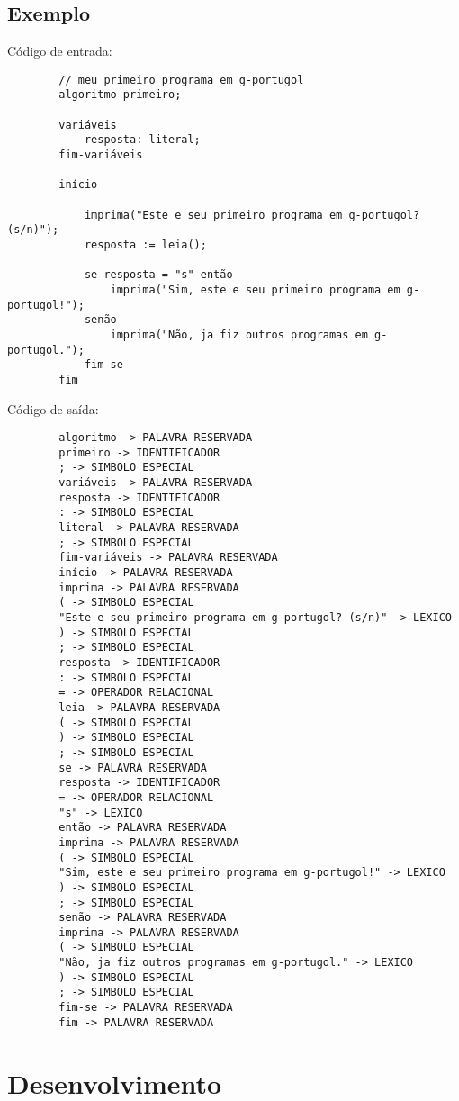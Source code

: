 \documentclass[a4paper,10pt]{article}
\begin{document}
	\subsection{Exemplo}
		C\'odigo de entrada:

		\begin{verbatim}
		// meu primeiro programa em g-portugol
		algoritmo primeiro;

		variáveis
			resposta: literal;
		fim-variáveis

		início

			imprima("Este e seu primeiro programa em g-portugol? (s/n)");
			resposta := leia();

			se resposta = "s" então
				imprima("Sim, este e seu primeiro programa em g-portugol!");
			senão
				imprima("Não, ja fiz outros programas em g-portugol.");
			fim-se
		fim
		\end{verbatim}

		C\'odigo de saída:

		\begin{verbatim}
		algoritmo -> PALAVRA RESERVADA
		primeiro -> IDENTIFICADOR
		; -> SIMBOLO ESPECIAL
		variáveis -> PALAVRA RESERVADA
		resposta -> IDENTIFICADOR
		: -> SIMBOLO ESPECIAL
		literal -> PALAVRA RESERVADA
		; -> SIMBOLO ESPECIAL
		fim-variáveis -> PALAVRA RESERVADA
		início -> PALAVRA RESERVADA
		imprima -> PALAVRA RESERVADA
		( -> SIMBOLO ESPECIAL
		"Este e seu primeiro programa em g-portugol? (s/n)" -> LEXICO
		) -> SIMBOLO ESPECIAL
		; -> SIMBOLO ESPECIAL
		resposta -> IDENTIFICADOR
		: -> SIMBOLO ESPECIAL
		= -> OPERADOR RELACIONAL
		leia -> PALAVRA RESERVADA
		( -> SIMBOLO ESPECIAL
		) -> SIMBOLO ESPECIAL
		; -> SIMBOLO ESPECIAL
		se -> PALAVRA RESERVADA
		resposta -> IDENTIFICADOR
		= -> OPERADOR RELACIONAL
		"s" -> LEXICO
		então -> PALAVRA RESERVADA
		imprima -> PALAVRA RESERVADA
		( -> SIMBOLO ESPECIAL
		"Sim, este e seu primeiro programa em g-portugol!" -> LEXICO
		) -> SIMBOLO ESPECIAL
		; -> SIMBOLO ESPECIAL
		senão -> PALAVRA RESERVADA
		imprima -> PALAVRA RESERVADA
		( -> SIMBOLO ESPECIAL
		"Não, ja fiz outros programas em g-portugol." -> LEXICO
		) -> SIMBOLO ESPECIAL
		; -> SIMBOLO ESPECIAL
		fim-se -> PALAVRA RESERVADA
		fim -> PALAVRA RESERVADA

		\end{verbatim}

		 


\section{Desenvolvimento}
\end{document}
